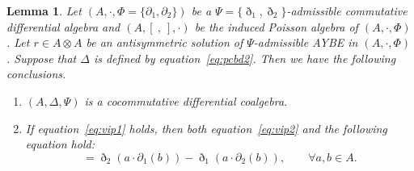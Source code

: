 \documentclass[pdftex]{sigma}
\numberwithin{equation}{section}
\newtheorem{Lemma}[Theorem]{Lemma}
\begin{document}
\begin{Lemma}\label{lem:tch}
 Let $(A, \cdot, \Phi = \{\partial_1, \partial_2\})$ be a $\Psi = \{\eth_1, \eth_2\}$-admissible commutative differential algebra and $(A, [\ ,\ ], \cdot)$ be the induced Poisson algebra of $(A, \cdot, \Phi)$.
 Let $r \in A \otimes A$ be an antisymmetric solution of $\Psi$-admissible AYBE in $(A, \cdot, \Phi)$.
 Suppose that $\Delta$ is defined by equation~\eqref{eq:pcbd2}.
 Then we have the following conclusions.
 \begin{enumerate}\itemsep=0pt
 \item[$(1)$] $(A, \Delta, \Psi)$ is a cocommutative differential coalgebra.
 \item[$(2)$] If equation~\eqref{eq:vip1} holds, then both equation~\eqref{eq:vip2} and the following equation hold:
 \begin{equation}
 [a, b] = \eth_2(a \cdot \partial_1(b)) - \eth_1(a \cdot \partial_2(b)), \qquad \forall a, b \in A. \label{eq:liepq}
 \end{equation}
 \end{enumerate}
\end{Lemma}
\end{document}
